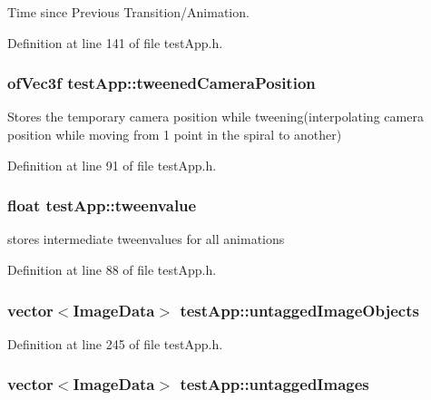 Time since Previous Transition/\-Animation. 



Definition at line 141 of file test\-App.\-h.

\hypertarget{classtest_app_ae9f60797c1c5d9f1ac06e1d6a5259957}{
\subsubsection[{tweened\-Camera\-Position}]{\setlength{\rightskip}{0pt plus 5cm}of\-Vec3f test\-App\-::tweened\-Camera\-Position}}\label{classtest_app_ae9f60797c1c5d9f1ac06e1d6a5259957}


Stores the temporary camera position while tweening(interpolating camera position while moving from 1 point in the spiral to another) 



Definition at line 91 of file test\-App.\-h.

\hypertarget{classtest_app_add9ab1aa902948afbdf1c6db0dfde385}{
\subsubsection[{tweenvalue}]{\setlength{\rightskip}{0pt plus 5cm}float test\-App\-::tweenvalue}}\label{classtest_app_add9ab1aa902948afbdf1c6db0dfde385}


stores intermediate tweenvalues for all animations 



Definition at line 88 of file test\-App.\-h.

\hypertarget{classtest_app_ae31cc868f554f62b4c6e4e9db3b4155b}{
\subsubsection[{untagged\-Image\-Objects}]{\setlength{\rightskip}{0pt plus 5cm}vector$<${\bf Image\-Data}$>$ test\-App\-::untagged\-Image\-Objects}}\label{classtest_app_ae31cc868f554f62b4c6e4e9db3b4155b}


Definition at line 245 of file test\-App.\-h.

\hypertarget{classtest_app_a9cb9aa0700c4c8b316329a86c4e650ec}{
\subsubsection[{untagged\-Images}]{\setlength{\rightskip}{0pt plus 5cm}vector$<${\bf Image\-Data}$>$ test\-App\-::untagged\-Images}}\label{classtest_app_a9cb9aa0700c4c8b316329a86c4e650ec}


